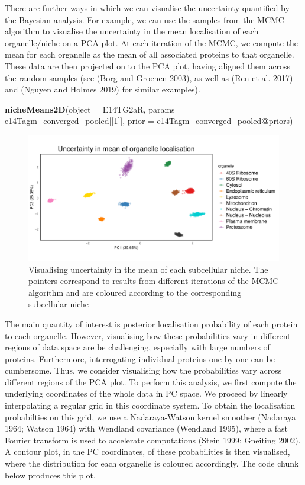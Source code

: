 \documentclass[
]{article}
\newenvironment{Shaded}{\begin{snugshade}}{\end{snugshade}}
\newcommand{\DataTypeTok}[1]{\textcolor[rgb]{0.13,0.29,0.53}{#1}}
\newcommand{\DecValTok}[1]{\textcolor[rgb]{0.00,0.00,0.81}{#1}}
\newcommand{\KeywordTok}[1]{\textcolor[rgb]{0.13,0.29,0.53}{\textbf{#1}}}
\newcommand{\NormalTok}[1]{#1}
\newcommand{\OperatorTok}[1]{\textcolor[rgb]{0.81,0.36,0.00}{\textbf{#1}}}
\begin{document}
There are further ways in which we can visualise the uncertainty
quantified by the Bayesian analysis. For example, we can use the samples
from the MCMC algorithm to visualise the uncertainty in the mean
localisation of each organelle/niche on a PCA plot. At each iteration of
the MCMC, we compute the mean for each organelle as the mean of all
associated proteins to that organelle. These data are then projected on
to the PCA plot, having aligned them across the random samples (see
(Borg and Groenen 2003), as well as (Ren et al. 2017) and (Nguyen and
Holmes 2019) for similar examples).

\begin{Shaded}
\begin{Highlighting}[]
\KeywordTok{nicheMeans2D}\NormalTok{(}\DataTypeTok{object =}\NormalTok{ E14TG2aR, }\DataTypeTok{params =}\NormalTok{ e14Tagm_converged_pooled[[}\DecValTok{1}\NormalTok{]], }\DataTypeTok{prior =}\NormalTok{ e14Tagm_converged_pooled}\OperatorTok{@}\NormalTok{priors)}
\end{Highlighting}
\end{Shaded}

\begin{figure}
\includegraphics[width=0.7\linewidth]{F1000TAGMworkflow_rev1_files/figure-latex/nicheuncertainty-1} \caption{Visualising uncertainty in the mean of each subcellular niche. The pointers correspond to results from different iterations of the MCMC algorithm and are coloured according to the corresponding subcellular niche}\label{fig:nicheuncertainty}
\end{figure}

The main quantity of interest is posterior localisation probability of
each protein to each organelle. However, visualising how these
probabilities vary in different regions of data space are be
challenging, especially with large numbers of proteins. Furthermore,
interrogating individual proteins one by one can be cumbersome. Thus, we
consider visualising how the probabilities vary across different regions
of the PCA plot. To perform this analysis, we first compute the
underlying coordinates of the whole data in PC space. We proceed by
linearly interpolating a regular grid in this coordinate system. To
obtain the localisation probabilties on this grid, we use a
Nadaraya-Watson kernel smoother (Nadaraya 1964; Watson 1964) with
Wendland covariance (Wendland 1995), where a fast Fourier transform is
used to accelerate computations (Stein 1999; Gneiting 2002). A contour
plot, in the PC coordinates, of these probabilities is then visualised,
where the distribution for each organelle is coloured accordingly. The
code chunk below produces this plot.
\end{document}
